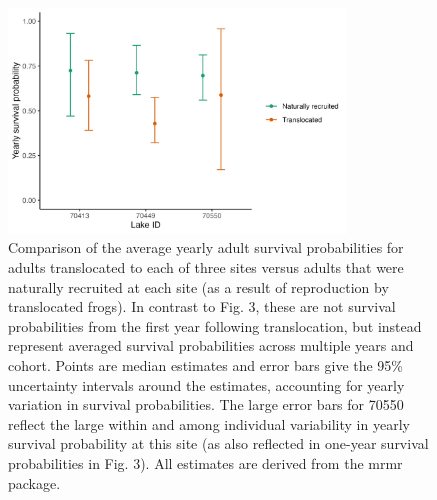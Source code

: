 \documentclass[9pt,twoside,lineno]{pnas-new}
\begin{document}
\begin{figure}

{\centering \includegraphics[width=0.8\textwidth]{figures/compare_surv_probs.jpg}

}

\caption{\label{fig-compare_surv_probs}Comparison of the average yearly
adult survival probabilities for adults translocated to each of three
sites versus adults that were naturally recruited at each site (as a
result of reproduction by translocated frogs). In contrast to
Fig. 3, these are not survival
probabilities from the first year following translocation, but instead
represent averaged survival probabilities across multiple years and
cohort. Points are median estimates and error bars give the 95\%
uncertainty intervals around the estimates, accounting for yearly
variation in survival probabilities. The large error bars for 70550
reflect the large within and among individual variability in yearly
survival probability at this site (as also reflected in one-year
survival probabilities in Fig. 3). All
estimates are derived from the mrmr package.}

\end{figure}\clearpage
\end{document}
